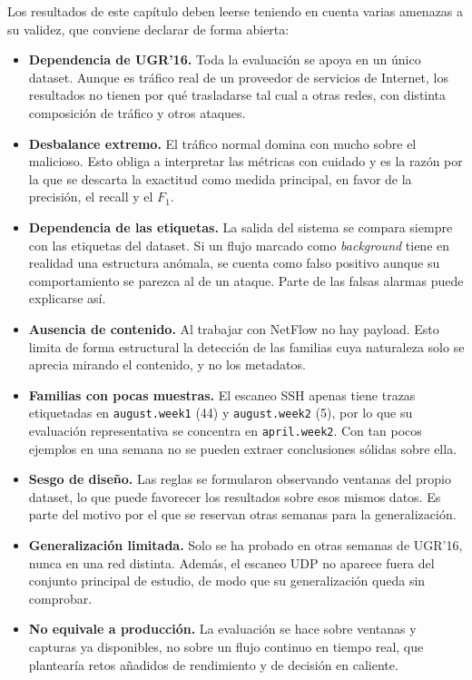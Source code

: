 Los resultados de este capítulo deben leerse teniendo en cuenta varias amenazas a su validez, que conviene declarar de forma abierta:

\begin{itemize}
  \item \textbf{Dependencia de UGR'16.} Toda la evaluación se apoya en un único dataset. Aunque es tráfico real de un proveedor de servicios de Internet, los resultados no tienen por qué trasladarse tal cual a otras redes, con distinta composición de tráfico y otros ataques.
  \item \textbf{Desbalance extremo.} El tráfico normal domina con mucho sobre el malicioso. Esto obliga a interpretar las métricas con cuidado y es la razón por la que se descarta la exactitud como medida principal, en favor de la precisión, el recall y el $F_1$.
  \item \textbf{Dependencia de las etiquetas.} La salida del sistema se compara siempre con las etiquetas del dataset. Si un flujo marcado como \emph{background} tiene en realidad una estructura anómala, se cuenta como falso positivo aunque su comportamiento se parezca al de un ataque. Parte de las falsas alarmas puede explicarse así.
  \item \textbf{Ausencia de contenido.} Al trabajar con NetFlow no hay payload. Esto limita de forma estructural la detección de las familias cuya naturaleza solo se aprecia mirando el contenido, y no los metadatos.
  \item \textbf{Familias con pocas muestras.} El escaneo SSH apenas tiene trazas etiquetadas en \texttt{august.week1} (44) y \texttt{august.week2} (5), por lo que su evaluación representativa se concentra en \texttt{april.week2}. Con tan pocos ejemplos en una semana no se pueden extraer conclusiones sólidas sobre ella.
  \item \textbf{Sesgo de diseño.} Las reglas se formularon observando ventanas del propio dataset, lo que puede favorecer los resultados sobre esos mismos datos. Es parte del motivo por el que se reservan otras semanas para la generalización.
  \item \textbf{Generalización limitada.} Solo se ha probado en otras semanas de UGR'16, nunca en una red distinta. Además, el escaneo UDP no aparece fuera del conjunto principal de estudio, de modo que su generalización queda sin comprobar.
  \item \textbf{No equivale a producción.} La evaluación se hace sobre ventanas y capturas ya disponibles, no sobre un flujo continuo en tiempo real, que plantearía retos añadidos de rendimiento y de decisión en caliente.
\end{itemize}

